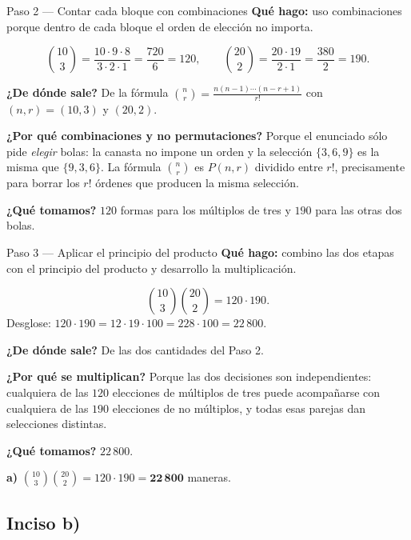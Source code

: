 \documentclass[11pt]{article}
\begin{document}
\begin{paso}{Paso 2 --- Contar cada bloque con combinaciones}
\textbf{Qué hago:} uso combinaciones porque dentro de cada bloque el orden de elección no importa.

\[
\binom{10}{3} = \frac{10\cdot 9\cdot 8}{3\cdot 2\cdot 1} = \frac{720}{6} = 120,
\qquad
\binom{20}{2} = \frac{20\cdot 19}{2\cdot 1} = \frac{380}{2} = 190 .
\]

\textbf{¿De dónde sale?} De la fórmula $\binom{n}{r}=\frac{n(n-1)\cdots(n-r+1)}{r!}$ con $(n,r)=(10,3)$ y $(20,2)$.

\textbf{¿Por qué combinaciones y no permutaciones?} Porque el enunciado sólo pide \emph{elegir} bolas: la canasta no impone un orden y la selección $\{3,6,9\}$ es la misma que $\{9,3,6\}$. La fórmula $\binom{n}{r}$ es $P(n,r)$ dividido entre $r!$, precisamente para borrar los $r!$ órdenes que producen la misma selección.

\textbf{¿Qué tomamos?} $120$ formas para los múltiplos de tres y $190$ para las otras dos bolas.
\end{paso}

\begin{paso}{Paso 3 --- Aplicar el principio del producto}
\textbf{Qué hago:} combino las dos etapas con el principio del producto y desarrollo la multiplicación.

\[
\binom{10}{3}\binom{20}{2} = 120\cdot 190 .
\]
Desglose: $120\cdot 190 = 12\cdot 19\cdot 100 = 228\cdot 100 = 22\,800$.

\textbf{¿De dónde sale?} De las dos cantidades del Paso 2.

\textbf{¿Por qué se multiplican?} Porque las dos decisiones son independientes: cualquiera de las $120$ elecciones de múltiplos de tres puede acompañarse con cualquiera de las $190$ elecciones de no múltiplos, y todas esas parejas dan selecciones distintas.

\textbf{¿Qué tomamos?} $22\,800$.
\end{paso}

\begin{resp}
\textbf{a)} $\displaystyle \binom{10}{3}\binom{20}{2} = 120\cdot 190 = \mathbf{22\,800}$ maneras.
\end{resp}

\subsection*{Inciso b)}
\end{document}
